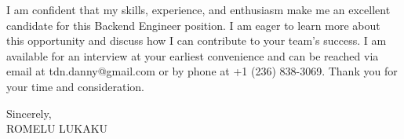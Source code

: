 \documentclass[letterpaper,11pt]{article}
\begin{document}
I am confident that my skills, experience, and enthusiasm make me an excellent candidate for this Backend Engineer position. I am eager to learn more about this opportunity and discuss how I can contribute to your team's success. I am available for an interview at your earliest convenience and can be reached via email at tdn.danny@gmail.com or by phone at +1 (236) 838-3069. Thank you for your time and consideration.
\vspace{20pt}

Sincerely, \\
\vspace{40pt} %
ROMELU LUKAKU

\end{document}
